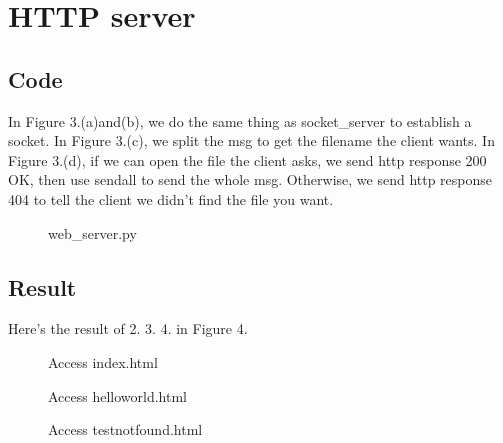 \documentclass[12pt,a4paper]{article}
\begin{document}
\section{HTTP server}    
\subsection{Code}
In Figure 3.(a)and(b), we do the same thing as socket\_server to establish a socket.
In Figure 3.(c), we split the msg to get the filename the client wants.
In Figure 3.(d), if we can open the file the client asks, we send http response 200 OK, then use sendall to send the whole msg.
Otherwise, we send http response 404 to tell the client we didn't find the file you want.
\begin{figure}[H]
    \centering
    \caption{web\_server.py}
\end{figure}
\subsection{Result}
Here's the result of 2. 3. 4. in Figure 4.
\begin{figure}[H]
    \centering
    \caption{Access index.html}
\end{figure}
\begin{figure}[H]
    \caption{Access helloworld.html}
\end{figure}
\begin{figure}[H]
    \caption{Access testnotfound.html}
\end{figure}
\newpage
\end{document}
